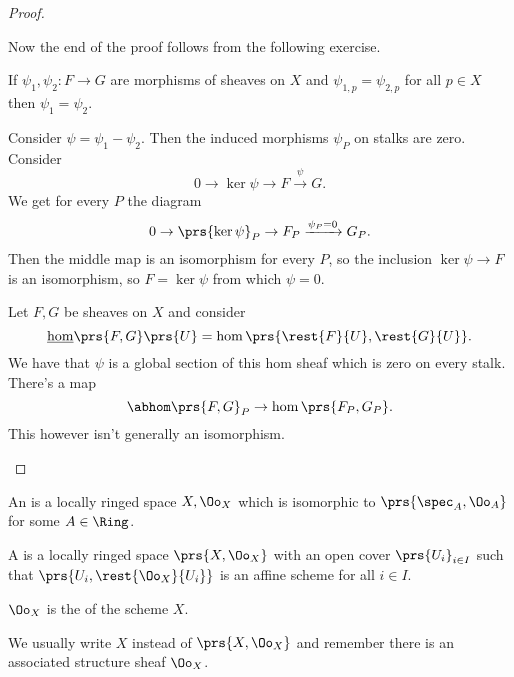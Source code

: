 \documentclass[10pt,a4paper,twoside,openany,hidelinks]{book}
\begin{document}
\begin{proof}
\begin{enumerate}
Now the end of the proof follows from the following exercise.

\begin{exercise}
If $\psi_1, \psi_2 \colon F \to G$ are morphisms of sheaves on $X$ and $\psi_{1,p} = \psi_{2,p}$ for all $p \in X$ then $\psi_1 = \psi_2$.
\end{exercise}

\begin{solution}
Consider $\psi = \psi_1 - \psi_2$.
Then the induced morphisms $\psi_P$ on stalks are zero.
Consider
\[0 \to \ker \psi \to F \xrightarrow{\psi} G \text{.}\]
We get for every $P$ the diagram
\[0 \to \prs{\ker \psi}_P \to F_P \xrightarrow{\psi_P = 0} G_P \text{.}\]
Then the middle map is an isomorphism for every $P$, so the inclusion
$\ker \psi \to F$ is an isomorphism, so $F = \ker \psi$ from which $\psi = 0$.
\end{solution}

 Let $F,G$ be sheaves on $X$ and consider \[\underline{\hom}\prs{F,G}\prs{U} = \hom\prs{\rest{F}{U}, \rest{G}{U}} \text{.}\]
We have that $\psi$ is a global section of this hom sheaf which is zero on every stalk. There's a map
\[\abhom\prs{F,G}_P \to \hom\prs{F_P, G_P} \text{.}\]
This however isn't generally an isomorphism.
\end{enumerate}
\end{proof}


\begin{definition}
An  is a locally ringed space $X, \Oo_X$ which is isomorphic to $\prs{\spec_A, \Oo_A}$ for some $A \in \Ring$.
\end{definition}

\begin{definition}[Scheme]
A  is a locally ringed space $\prs{X, \Oo_X}$ with an open cover $\prs{U_i}_{i \in I}$ such that $\prs{U_i, \rest{\Oo_X}{U_i}}$ is an affine scheme for all $i \in I$.
\end{definition}

\begin{definition}
$\Oo_X$ is the  of the scheme $X$.
\end{definition}

\begin{remark}
We usually write $X$ instead of $\prs{X, \Oo_X}$ and remember there is an associated structure sheaf $\Oo_X$.
\end{remark}
\end{document}
